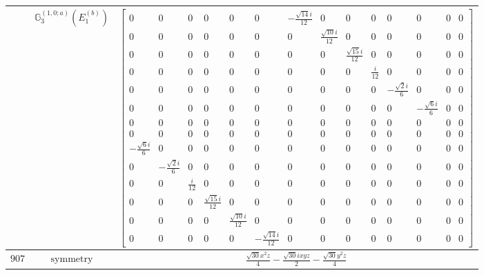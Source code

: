 \documentclass[fleqn,8pt,landscape]{jsarticle}
\begin{document}
\begin{longtable}{ccc}
$  $ & $ \mathbb{G}_{3}^{(1,0;a)}(E_{1}^{(b)}) $ & $ \begin{bmatrix} 0 & 0 & 0 & 0 & 0 & 0 & - \frac{\sqrt{14} i}{12} & 0 & 0 & 0 & 0 & 0 & 0 & 0 \\ 0 & 0 & 0 & 0 & 0 & 0 & 0 & \frac{\sqrt{10} i}{12} & 0 & 0 & 0 & 0 & 0 & 0 \\ 0 & 0 & 0 & 0 & 0 & 0 & 0 & 0 & \frac{\sqrt{15} i}{12} & 0 & 0 & 0 & 0 & 0 \\ 0 & 0 & 0 & 0 & 0 & 0 & 0 & 0 & 0 & \frac{i}{12} & 0 & 0 & 0 & 0 \\ 0 & 0 & 0 & 0 & 0 & 0 & 0 & 0 & 0 & 0 & - \frac{\sqrt{2} i}{6} & 0 & 0 & 0 \\ 0 & 0 & 0 & 0 & 0 & 0 & 0 & 0 & 0 & 0 & 0 & - \frac{\sqrt{6} i}{6} & 0 & 0 \\ 0 & 0 & 0 & 0 & 0 & 0 & 0 & 0 & 0 & 0 & 0 & 0 & 0 & 0 \\ 0 & 0 & 0 & 0 & 0 & 0 & 0 & 0 & 0 & 0 & 0 & 0 & 0 & 0 \\ - \frac{\sqrt{6} i}{6} & 0 & 0 & 0 & 0 & 0 & 0 & 0 & 0 & 0 & 0 & 0 & 0 & 0 \\ 0 & - \frac{\sqrt{2} i}{6} & 0 & 0 & 0 & 0 & 0 & 0 & 0 & 0 & 0 & 0 & 0 & 0 \\ 0 & 0 & \frac{i}{12} & 0 & 0 & 0 & 0 & 0 & 0 & 0 & 0 & 0 & 0 & 0 \\ 0 & 0 & 0 & \frac{\sqrt{15} i}{12} & 0 & 0 & 0 & 0 & 0 & 0 & 0 & 0 & 0 & 0 \\ 0 & 0 & 0 & 0 & \frac{\sqrt{10} i}{12} & 0 & 0 & 0 & 0 & 0 & 0 & 0 & 0 & 0 \\ 0 & 0 & 0 & 0 & 0 & - \frac{\sqrt{14} i}{12} & 0 & 0 & 0 & 0 & 0 & 0 & 0 & 0 \end{bmatrix} $ \\ \hline
$ 907 $ & $ \text{symmetry} $ & $ \frac{\sqrt{30} x^{2} z}{4} - \frac{\sqrt{30} i x y z}{2} - \frac{\sqrt{30} y^{2} z}{4} $ \\

\end{longtable}
\end{document}
